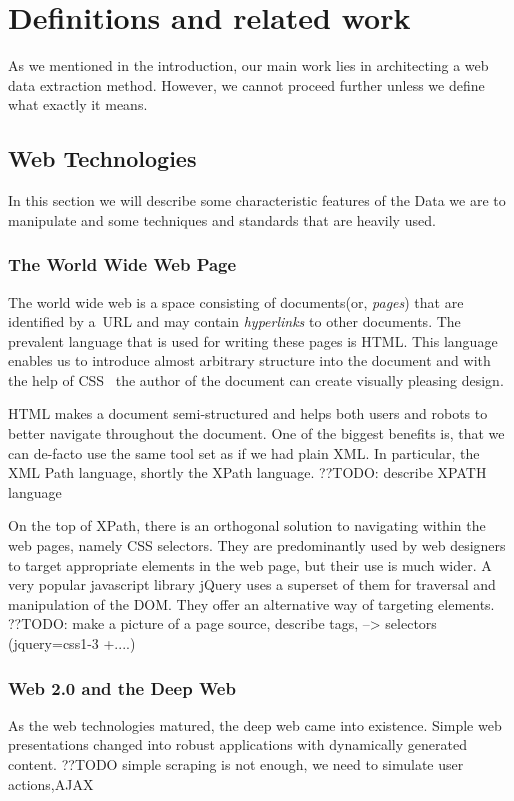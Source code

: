 \chapter{Definitions and related work}

As we mentioned in the introduction, our main work lies in architecting a web data extraction method.
However, we cannot proceed further unless we define what exactly it means.


\section{Web Technologies}
In this section we will describe some characteristic features of the Data we are to manipulate and some techniques and standards that are heavily used.

\subsection{The World Wide Web Page}
\label{sec:phase1Interaction}
The world wide web is a space consisting of documents(or, \textit{pages}) that are identified by a~URL and may contain \textit{hyperlinks} to other documents.
The prevalent language that is used for writing these pages is HTML\cite{html5}. 
This language enables us to introduce almost arbitrary structure into the document and with the help of CSS~\cite{css} the author of the document can create visually pleasing design.

HTML makes a document semi-structured and helps both users and robots to better navigate throughout the document. One of the biggest benefits is, that we can de-facto use the same tool set as if we had plain XML. In particular, the XML Path language, shortly the XPath language\cite{xpath}.
??TODO: describe XPATH language

On the top of XPath, there is an orthogonal solution to navigating within the web pages, namely CSS selectors\cite{cssSelectors}. They are predominantly used by web designers to target appropriate elements in the web page, but their use is much wider. A very popular javascript library jQuery\cite{jQuery} uses a superset of them for traversal and manipulation of the DOM\cite{jQuerySelectors}. They offer an alternative way of targeting elements.
??TODO: make a picture of a page source, describe tags, --> selectors (jquery=css1-3 +....)

\subsection{Web 2.0 and the Deep Web}
As the web technologies matured, the deep web came into existence. Simple web presentations
changed into robust applications with dynamically generated content.
??TODO simple scraping is not enough, we need to simulate user actions,AJAX




